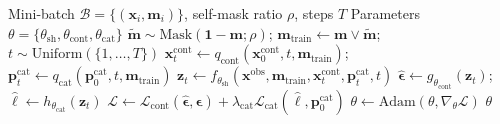 \documentclass[times, review, 10pt]{elsarticle}
\newcommand{\DIFaddbegin}{\begingroup\color{blue}}
\newcommand{\algsmall}{\footnotesize}
\begin{document}
\DIFaddbegin
\begin{algorithm}[t]
\caption{MissHDD joint training with self-masking}
\label{alg:training}
\algsmall
\begin{algorithmic}[1]
\Require Mini-batch $\mathcal{B}=\{(\mathbf{x}_i,\mathbf{m}_i)\}$, self-mask ratio $\rho$, steps $T$
\Require Parameters $\theta=\{\theta_{\mathrm{sh}},\theta_{\mathrm{cont}},\theta_{\mathrm{cat}}\}$
        \State $\tilde{\mathbf{m}}\sim\mathrm{Mask}(\mathbf{1}-\mathbf{m};\rho)$;\quad
        $\mathbf{m}_{\mathrm{train}}\gets \mathbf{m}\lor\tilde{\mathbf{m}}$;\quad
        $t\sim\mathrm{Uniform}(\{1,\ldots,T\})$
        \State $\mathbf{x}^{\mathrm{cont}}_t\gets q_{\mathrm{cont}}(\mathbf{x}^{\mathrm{cont}}_0,t,\mathbf{m}_{\mathrm{train}})$;\quad
        $\mathbf{p}^{\mathrm{cat}}_t\gets q_{\mathrm{cat}}(\mathbf{p}^{\mathrm{cat}}_0,t,\mathbf{m}_{\mathrm{train}})$
        \State $\mathbf{z}_t\gets f_{\theta_{\mathrm{sh}}}(\mathbf{x}^{\mathrm{obs}},\mathbf{m}_{\mathrm{train}},
        \mathbf{x}^{\mathrm{cont}}_t,\mathbf{p}^{\mathrm{cat}}_t,t)$
        \State $\hat{\boldsymbol{\epsilon}}\gets g_{\theta_{\mathrm{cont}}}(\mathbf{z}_t)$;\quad
        $\hat{\boldsymbol{\ell}}\gets h_{\theta_{\mathrm{cat}}}(\mathbf{z}_t)$
    \EndFor
    \State $\mathcal{L}\gets \mathcal{L}_{\mathrm{cont}}(\hat{\boldsymbol{\epsilon}},\boldsymbol{\epsilon})
    +\lambda_{\mathrm{cat}}\mathcal{L}_{\mathrm{cat}}(\hat{\boldsymbol{\ell}},\mathbf{p}^{\mathrm{cat}}_0)$
    \State $\theta\gets\mathrm{Adam}(\theta,\nabla_\theta\mathcal{L})$
\EndFor
\State \Return $\theta$
\end{algorithmic}
\end{algorithm}
\end{document}
